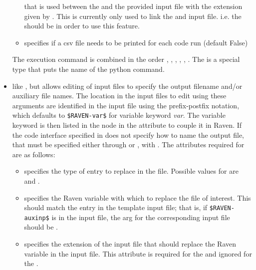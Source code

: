 \begin{itemize}
\begin{itemize}
      that is used between the  and the provided input file with
      the extension given by .
      \nb This is currently only used to link the  and input file. i.e.
      the  should be  in order to use this feature.
   \item {}  specifies if a csv file needs to be 
      printed for each code run (default False)
  \end{itemize}
  The execution command is combined in the order , 
  , , , ,
  .  The  is a special type that puts the name of the python command.
  \item {}  like ,
  but allows editing of input files to specify the output filename and/or auxiliary
  file names.
  The location in the input files to edit using these arguments are identified in
  the input file using the prefix-postfix notation, which defaults to
  \texttt{\$RAVEN-var\$} for variable keyword \emph{var}.  The variable keyword
  is then listed in the  node in the attribute  to
  couple it in Raven.
  If the code interface specified in  
  does not specify how to name the output file, that must be specified either through
   or , with  .
  The attributes required for  are as follows:
  \begin{itemize}
    \item {}  specifies the type
    of entry to replace in the file.  Possible values for 
     are  and .
    \item {}  specifies the Raven
    variable with which to replace the file of interest.  This should match
    the entry in the template input file; that is, if \texttt{\$RAVEN-auxinp\$}
    is in the input file, the arg for the corresponding input file should be
    .
    \item {}  specifies the
    extension of the input file that should replace the Raven variable in
    the input file.  This attribute is required for the  
    and ignored for the  .
  \end{itemize}
\end{itemize}
